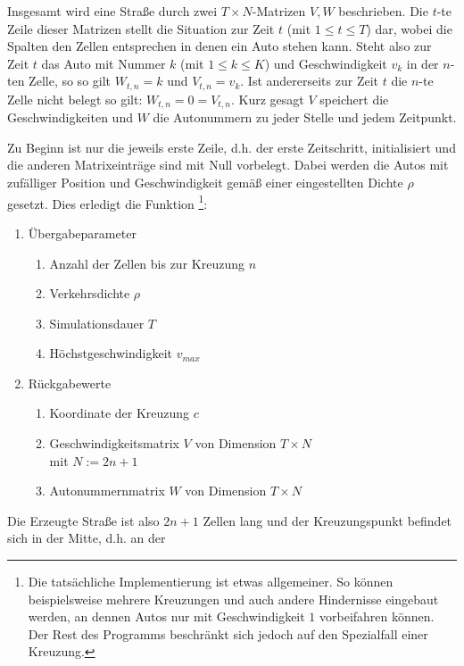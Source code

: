 Insgesamt wird eine Straße durch zwei \(T \times N\)-Matrizen \(V, W\) beschrieben.
Die \(t\)-te Zeile dieser Matrizen stellt die Situation zur Zeit \(t\) (mit \(1 \leq t \leq T\)) dar, 
wobei die Spalten den Zellen entsprechen in denen ein Auto stehen kann. 
Steht also zur Zeit \(t\) das Auto mit Nummer \(k\) (mit \(1 \leq k \leq K\)) und Geschwindigkeit \(v_k\) in der \(n\)-ten Zelle, 
so so gilt \( W_{t, n} = k\) und \(V_{t, n} = v_k\). 
Ist andererseits zur Zeit \(t\) die \(n\)-te Zelle nicht belegt so gilt: \(W_{t, n} = 0 = V_{t, n}\).
Kurz gesagt \(V\) speichert die Geschwindigkeiten und \(W\) die Autonummern zu jeder Stelle und jedem Zeitpunkt.

Zu Beginn ist nur die jeweils erste Zeile, d.h. der erste Zeitschritt, initialisiert und die anderen Matrixeinträge
sind mit Null vorbelegt. Dabei werden die Autos mit zufälliger Position und Geschwindigkeit gemäß
einer eingestellten Dichte \(\rho\) gesetzt. Dies erledigt die Funktion  \footnote{Die tatsächliche 
Implementierung ist etwas allgemeiner. So können beispielsweise mehrere Kreuzungen und auch andere
Hindernisse eingebaut werden, an dennen Autos nur mit Geschwindigkeit \(1\) vorbeifahren können. Der Rest des Programms 
beschränkt sich jedoch auf den Spezialfall einer Kreuzung.}:
\begin{enumerate}
  \item Übergabeparameter
    \begin{enumerate}
      \item Anzahl der Zellen bis zur Kreuzung \(n\) 
      \item Verkehrsdichte \(\rho\)
      \item Simulationsdauer \(T\)
      \item Höchstgeschwindigkeit \(v_{max}\) 
    \end{enumerate}
  \item Rückgabewerte
    \begin{enumerate}
      \item Koordinate der Kreuzung \(c\) 
      \item Geschwindigkeitsmatrix \(V\) von Dimension \(T \times N\) \\ mit \(N := 2n+1\)
      \item Autonummernmatrix \(W\) von Dimension \(T \times N\) 
    \end{enumerate}
\end{enumerate}
Die Erzeugte Straße ist also \(2n+1\) Zellen lang und der Kreuzungspunkt befindet sich  in der Mitte, d.h. an der 
